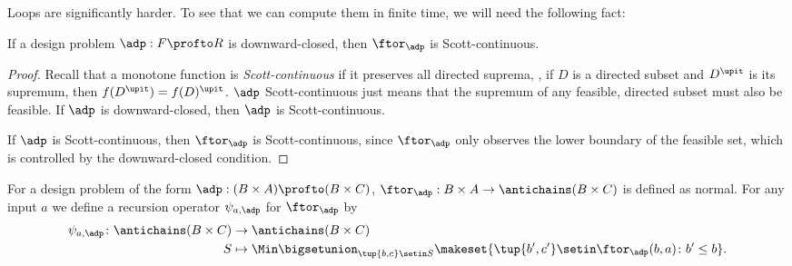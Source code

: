 Loops are significantly harder.
To see that we can compute them in finite time, we will need the following fact:
\begin{lemma}
    If a design problem $\adp : F \profto R$ is downward-closed, then $\ftor_\adp$ is Scott-continuous.
\end{lemma}

\begin{proof}
    Recall that a monotone function is \emph{Scott-continuous} if it preserves all directed suprema, \ie,  if $D$ is a directed subset and $D^\upit$ is its supremum, then $f(D^\upit) = f(D)^\upit$.
    $\adp$ Scott-continuous just means that the supremum of any feasible, directed subset must also be feasible.
    If $\adp$ is downward-closed, then $\adp$ is Scott-continuous.


    If $\adp$ is Scott-continuous, then $\ftor_\adp$ is Scott-continuous, since $\ftor_\adp$ only observes the lower boundary of the feasible set, which is controlled by the downward-closed condition.
\end{proof}

For a design problem of the form $\adp : (B \times A) \profto (B \times C)$, $\ftor_\adp : B \times A \to \antichains (B \times C)$ is defined as normal.
For any input $a$ we define a recursion operator $\psi_{a,\adp}$ for $\ftor_\adp$ by
\begin{equation}
    \begin{aligned}
        \psi_{a,\adp} \colon \antichains (B \times C) & \to \antichains (B \times C) \\
        S                                             & \mapsto \Min \bigsetunion_{\tup{b,c} \setin S} \makeset{ \tup{b',c'} \setin \ftor_\adp(b,a) \colon b' \leq b }.
    \end{aligned}
\end{equation}

